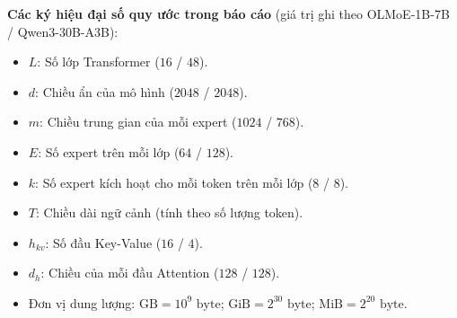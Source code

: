 \vspace{0.5cm}
\noindent\textbf{Các ký hiệu đại số quy ước trong báo cáo} (giá trị ghi theo OLMoE-1B-7B / Qwen3-30B-A3B):
\begin{itemize}
    \item $L$: Số lớp Transformer ($16$ / $48$).
    \item $d$: Chiều ẩn của mô hình ($2048$ / $2048$).
    \item $m$: Chiều trung gian của mỗi expert ($1024$ / $768$).
    \item $E$: Số expert trên mỗi lớp ($64$ / $128$).
    \item $k$: Số expert kích hoạt cho mỗi token trên mỗi lớp ($8$ / $8$).
    \item $T$: Chiều dài ngữ cảnh (tính theo số lượng token).
    \item $h_{kv}$: Số đầu Key-Value ($16$ / $4$).
    \item $d_h$: Chiều của mỗi đầu Attention ($128$ / $128$).
    \item Đơn vị dung lượng: $\text{GB} = 10^9\text{ byte}$; $\text{GiB} = 2^{30}\text{ byte}$; $\text{MiB} = 2^{20}\text{ byte}$.
\end{itemize}
